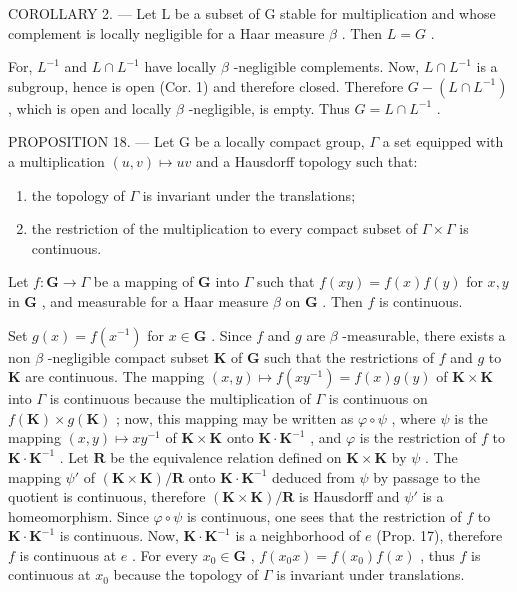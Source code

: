 COROLLARY 2. --- Let L be a subset of G stable for multiplication and whose complement is locally negligible for a Haar measure \(\beta\) . Then \(L = G\) .

For, \(L^{-1}\) and \(L \cap L^{-1}\) have locally \(\beta\) -negligible complements. Now, \(L \cap L^{-1}\) is a subgroup, hence is open (Cor. 1) and therefore closed. Therefore \(G - (L \cap L^{-1})\) , which is open and locally \(\beta\) -negligible, is empty. Thus \(G = L \cap L^{-1}\) .

PROPOSITION 18. --- Let G be a locally compact group, \(\Gamma\) a set equipped with a multiplication \((u,v)\mapsto uv\) and a Hausdorff topology such that:

\begin{enumerate}
\def\labelenumi{\arabic{enumi})}
\item
  the topology of \(\Gamma\) is invariant under the translations;
\item
  the restriction of the multiplication to every compact subset of \(\Gamma \times \Gamma\) is continuous.
\end{enumerate}

Let \(f: \mathbf{G} \to \Gamma\) be a mapping of \(\mathbf{G}\) into \(\Gamma\) such that \(f(xy) = f(x)f(y)\) for \(x, y\) in \(\mathbf{G}\) , and measurable for a Haar measure \(\beta\) on \(\mathbf{G}\) . Then \(f\) is continuous.

Set \(g(x) = f(x^{-1})\) for \(x \in \mathbf{G}\) . Since \(f\) and \(g\) are \(\beta\) -measurable, there exists a non \(\beta\) -negligible compact subset \(\mathbf{K}\) of \(\mathbf{G}\) such that the restrictions of \(f\) and \(g\) to \(\mathbf{K}\) are continuous. The mapping \((x,y) \mapsto f(xy^{-1}) = f(x)g(y)\) of \(\mathbf{K} \times \mathbf{K}\) into \(\Gamma\) is continuous because the multiplication of \(\Gamma\) is continuous on \(f(\mathbf{K}) \times g(\mathbf{K})\) ; now, this mapping may be written as \(\varphi \circ \psi\) , where \(\psi\) is the mapping \((x,y) \mapsto xy^{-1}\) of \(\mathbf{K} \times \mathbf{K}\) onto \(\mathbf{K} \cdot \mathbf{K}^{-1}\) , and \(\varphi\) is the restriction of \(f\) to \(\mathbf{K} \cdot \mathbf{K}^{-1}\) . Let \(\mathbf{R}\) be the equivalence relation defined on \(\mathbf{K} \times \mathbf{K}\) by \(\psi\) . The mapping \(\psi'\) of \((\mathbf{K} \times \mathbf{K}) / \mathbf{R}\) onto \(\mathbf{K} \cdot \mathbf{K}^{-1}\) deduced from \(\psi\) by passage to the quotient is continuous, therefore \((\mathbf{K} \times \mathbf{K}) / \mathbf{R}\) is Hausdorff and \(\psi'\) is a homeomorphism. Since \(\varphi \circ \psi\) is continuous, one sees that the restriction of \(f\) to \(\mathbf{K} \cdot \mathbf{K}^{-1}\) is continuous. Now, \(\mathbf{K} \cdot \mathbf{K}^{-1}\) is a neighborhood of \(e\) (Prop. 17), therefore \(f\) is continuous at \(e\) . For every \(x_0 \in \mathbf{G}\) , \(f(x_0x) = f(x_0)f(x)\) , thus \(f\) is continuous at \(x_0\) because the topology of \(\Gamma\) is invariant under translations.

